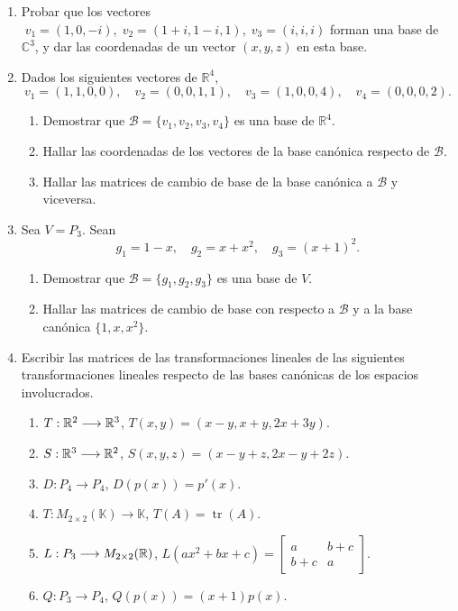 \begin{enumerate}[topsep=6pt, itemsep=.4cm]

\item
Probar que los vectores $\;v_1=(1,0,-i),\;
v_2=(1+i,1-i,1),\;v_3=(i,i,i)$ forman una base de $\mathbb{C}^3$,
y dar las coordenadas de un vector $(x,y,z)$ en esta base.


\item Dados los siguientes vectores de $\mathbb{R}^4$,
$$
v_1=(1,1,0,0), \quad v_2=(0,0,1,1), \quad v_3=(1,0,0,4),
\quad v_4=(0,0,0,2).
$$
\begin{enumerate}
    \item Demostrar que
    $\mathcal{B}=\{v_1,v_2,v_3,v_4\}$ es una base de
    $\mathbb{R}^{4}$.
    \item Hallar las coordenadas de los vectores de la
    base can\'onica respecto de $\mathcal{B}$.
    \item Hallar las matrices de cambio de base de la base can\'onica
    a $\mathcal{B}$ y viceversa.
\end{enumerate}


\item  Sea $V=P_3$.
Sean
$$ g_1=1-x,\quad g_2=x+x^2, \quad g_3=(x+1)^2.$$
\begin{enumerate}
    \item Demostrar que $\mathcal{B}=\{g_1,g_2,g_3\}$ es una base de $V$.
    \item Hallar las matrices de cambio de base con respecto a $\mathcal{B}$
    y a la base can{\'o}nica $\{1,x,x^2\}$.
\end{enumerate}



\item \label{lineales1-bases} Escribir las matrices de las transformaciones lineales de las siguientes transformaciones lineales respecto de las bases canónicas de los espacios involucrados.

    \begin{enumerate}
        \item\label{lineales1-bases-a} $T:\mathbb R^2 \longrightarrow \mathbb R^3$, $T(x,y)=(x-y,x+y,2x+3y)$.
        \item\label{lineales1-bases-b} $S:\mathbb R^3 \longrightarrow \mathbb R^2$, $S(x,y,z)=(x-y+z,2x-y+2z)$.
        \item\label{lineales1-base-c} $D:P_4  \longrightarrow P_4$, $D(p(x))=p'(x)$.
        \item $T:M_{2\times 2}(\mathbb{K}) \longrightarrow \mathbb{K}$, $T(A)=\operatorname{tr}(A)$.
        \item\label{lineales1-base-d} $L:P_3 \longrightarrow M_{2\times 2}(\mathbb R)$, $L(ax^2+bx+c)=\begin{bmatrix} a & b+c \\ b+c & a \end{bmatrix}$.
        \item\label{lineales1-base-e} $Q:P_3 \longrightarrow P_4$, $Q(p(x))=(x+1)p(x)$.
    \end{enumerate}




\end{enumerate}
